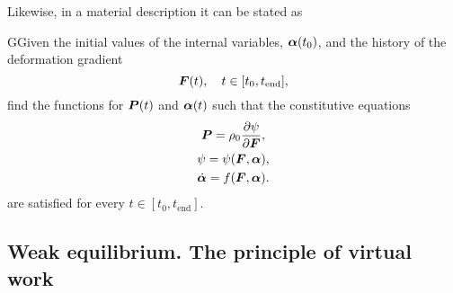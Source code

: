 Likewise, in a material description it can be stated as
    \begin{problem}
    GGiven the initial values of the internal variables, $\bm{\alpha}(t_0)$, and the history of the deformation gradient
    \begin{equation}
        \bm{F}(t),\quad t\in[t_0,t_\text{end}],
    \end{equation}
    find the functions for $\bm{P}(t)$ and $\bm{\alpha}(t)$ such that the constitutive equations
    \begin{gather}
        \bm{P} = \rho_0 \frac{\partial \psi}{\partial \bm{F}},\\
        \psi = \psi(\bm{F}, \bm{\alpha}),\\
        \dot{\bm{\alpha}} = f(\bm{F}, \bm{\alpha}).
    \end{gather}
    are satisfied for every $t\in [t_0, t_\text{end}]$.
    \end{problem}

\subsection{Weak equilibrium. The principle of virtual work}

